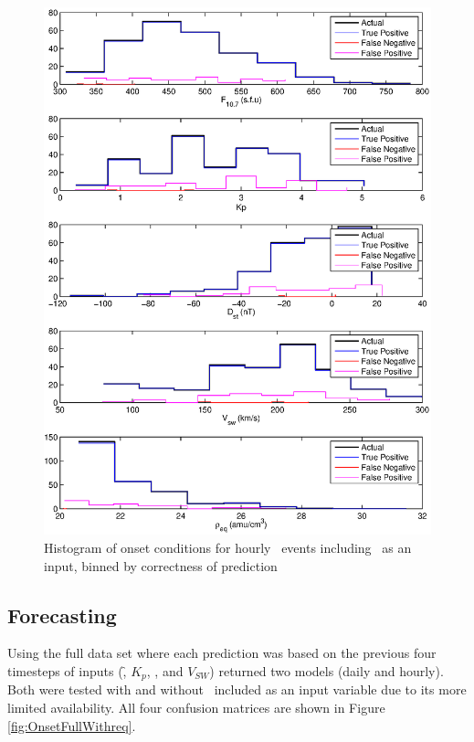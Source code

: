 \begin{figure}[htp!]
	\centering
	\includegraphics[width=1\linewidth]{Figures/CH5/NNBinaryOnset-hourly-withreq-hist.eps}
	\caption{Histogram of onset conditions for hourly \req\ events including \req\ as an input, binned by correctness of prediction}
	\label{fig:OnsetWithreq-hist}
\end{figure}


\clearpage

\subsection{Forecasting}

Using the full data set where each prediction was based on the previous four timesteps of inputs (\f, $K_p$, \dst, and $V_{SW}$) returned two models (daily and hourly). Both were tested with and without \req\ included as an input variable due to its more limited availability. All four confusion matrices are shown in Figure \ref{fig:OnsetFullWithreq}.

